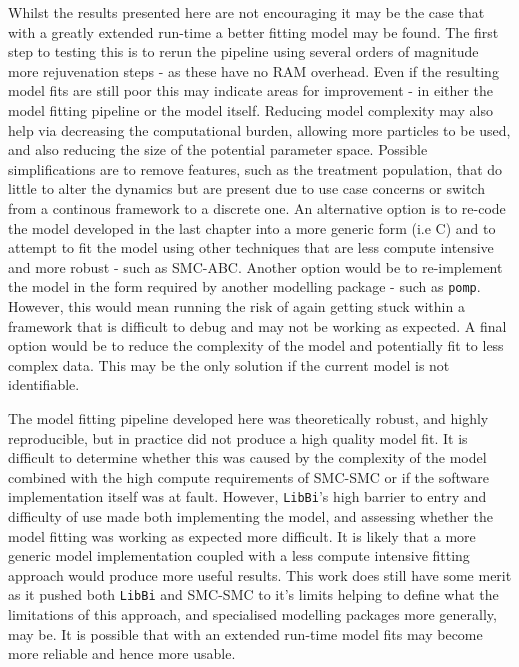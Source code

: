 \documentclass[11pt,twoside]{bristolthesis}
\begin{document}
  Whilst the results presented here are not encouraging it may be the case that with a greatly extended run-time a better fitting model may be found. The first step to testing this is to rerun the pipeline using several orders of magnitude more rejuvenation steps - as these have no RAM overhead. Even if the resulting model fits are still poor this may indicate areas for improvement - in either the model fitting pipeline or the model itself. Reducing model complexity may also help via decreasing the computational burden, allowing more particles to be used, and also reducing the size of the potential parameter space. Possible simplifications are to remove features, such as the treatment population, that do little to alter the dynamics but are present due to use case concerns or switch from a continous framework to a discrete one. An alternative option is to re-code the model developed in the last chapter into a more generic form (i.e C) and to attempt to fit the model using other techniques that are less compute intensive and more robust - such as SMC-ABC. Another option would be to re-implement the model in the form required by another modelling package - such as \texttt{pomp}. However, this would mean running the risk of again getting stuck within a framework that is difficult to debug and may not be working as expected. A final option would be to reduce the complexity of the model and potentially fit to less complex data. This may be the only solution if the current model is not identifiable.
  
  The model fitting pipeline developed here was theoretically robust, and highly reproducible, but in practice did not produce a high quality model fit. It is difficult to determine whether this was caused by the complexity of the model combined with the high compute requirements of SMC-SMC or if the software implementation itself was at fault. However, \texttt{LibBi}'s high barrier to entry and difficulty of use made both implementing the model, and assessing whether the model fitting was working as expected more difficult. It is likely that a more generic model implementation coupled with a less compute intensive fitting approach would produce more useful results. This work does still have some merit as it pushed both \texttt{LibBi} and SMC-SMC to it's limits helping to define what the limitations of this approach, and specialised modelling packages more generally, may be. It is possible that with an extended run-time model fits may become more reliable and hence more usable.
  
\end{document}
